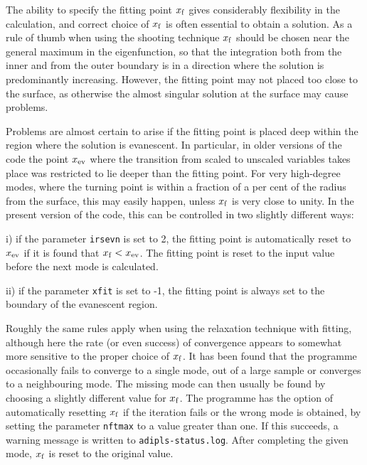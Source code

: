 The ability to specify the fitting point $x_{\rm f}$ gives considerably
flexibility in the calculation, and correct choice of $x_{\rm f}$ is
often essential to obtain a solution. As a rule of thumb when
using the shooting technique $x_{\rm f}$
should be chosen near the general maximum in the eigenfunction, so that
the integration both from the inner and from the outer 
boundary is in a direction where the solution is predominantly
increasing. However, the fitting point may not placed too close to
the surface, as otherwise the almost singular solution at the
surface may cause problems. 

Problems are almost certain to arise if the fitting point is placed
deep within the region where the solution is evanescent.
In particular, in older versions of the code the point
$x_{\rm ev}$ where the transition from scaled to
unscaled variables takes place was restricted to lie deeper
than the fitting point.
For very high-degree modes, where the turning point is within
a fraction of a per cent of the radius from the surface,
this may easily happen, unless $x_{\rm f}$ is very close to unity.
In the present version of the code, this can be controlled in two
slightly different ways:
\medskip
\item{i)} if the parameter {\tt irsevn} is set to 2,
the fitting point is automatically reset to
$x_{\rm ev}$ if it is found that $x_{\rm f} < x_{\rm ev}$.
The fitting point is reset to the input value before the
next mode is calculated.
\item{ii)}
if the parameter {\tt xfit} is set to -1, the fitting point
is always set to the boundary of the evanescent region.
\medskip

Roughly the same rules apply when using
the relaxation technique with fitting, although here the rate (or even success)
of convergence appears to somewhat more sensitive to the proper
choice of $x_{\rm f}$. 
It has been found that the programme occasionally fails to
converge to a single mode, out of a large sample
or converges to a neighbouring mode.
The missing mode can then usually be found by choosing a slightly
different value for $x_{\rm f}$.
The programme has the option of automatically resetting $x_{\rm f}$
if the iteration fails or the wrong mode is obtained,
by setting the parameter {\tt nftmax} to a value greater than one.
If this succeeds, a warning message is written to
{\tt adipls-status.log}.
After completing the given mode, $x_{\rm f}$ is reset to the original value.

